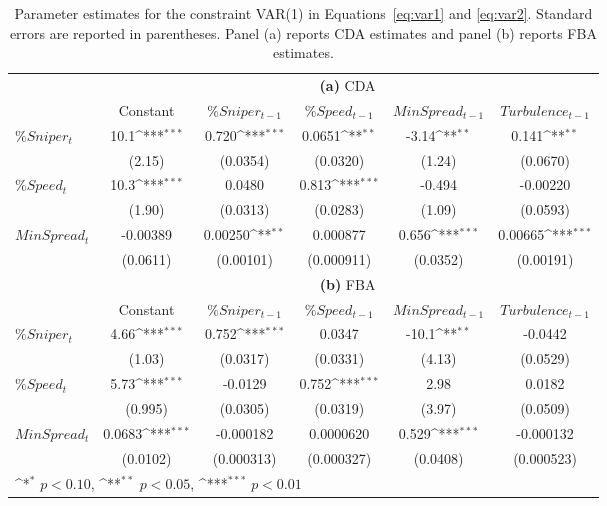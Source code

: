 \documentclass[12pt]{article}
\def\sym#1{\ifmmode^{#1}\else\(^{#1}\)\fi}
\begin{document}
\begin{table}[ht]
\vspace{.1in}
\begin{center}
\begin{tabular}{lccccc}
\hline %
& \multicolumn{5}{c}{{\bf (a)} CDA} \\
\cline{2-6} %
& Constant & $\%Sniper_{t-1}$ & $\%Speed_{t-1}$ & $MinSpread_{t-1}$ & $Turbulence_{t-1}$ \\
\hline %
$\%Sniper_t$ & 10.1\sym{***} & 0.720\sym{***} & 0.0651\sym{**} & -3.14\sym{**} & 0.141\sym{**} \\
& (2.15) & (0.0354) & (0.0320) & (1.24) & (0.0670) \\
$\%Speed_t$ & 10.3\sym{***} & 0.0480  & 0.813\sym{***} & -0.494 & -0.00220 \\
& (1.90) & (0.0313) & (0.0283) & (1.09) & (0.0593) \\
$MinSpread_t$ & -0.00389 & 0.00250\sym{**} & 0.000877 & 0.656\sym{***} & 0.00665\sym{***} \\
& (0.0611) & (0.00101) & (0.000911) & (0.0352) & (0.00191) \\
\hline %
& \multicolumn{5}{c}{{\bf (b)} FBA} \\
\cline{2-6} %
& Constant & $\%Sniper_{t-1}$ & $\%Speed_{t-1}$ & $MinSpread_{t-1}$ & $Turbulence_{t-1}$ \\
\hline %
$\%Sniper_t$ & 4.66\sym{***} & 0.752\sym{***} & 0.0347 & -10.1\sym{**} & -0.0442 \\
& (1.03) & (0.0317) & (0.0331) & (4.13) & (0.0529) \\
$\%Speed_t$ & 5.73\sym{***} & -0.0129 & 0.752\sym{***} & 2.98 & 0.0182 \\
&  (0.995) & (0.0305) & (0.0319) & (3.97) & (0.0509)\\
$MinSpread_t$ & 0.0683\sym{***} & -0.000182 & 0.0000620 & 0.529\sym{***} & -0.000132 \\
& (0.0102) & (0.000313) & (0.000327) & (0.0408) & (0.000523) \\
\hline %
\multicolumn{6}{l}{\footnotesize \sym{*} \(p<0.10\), \sym{**} \(p<0.05\), \sym{***} \(p<0.01\)}\\
\end{tabular}
\end{center}
\caption{Parameter estimates for the constraint VAR(1) in Equations~\eqref{eq:var1} and \eqref{eq:var2}. Standard errors are reported in parentheses. Panel (a) reports CDA estimates and panel (b) reports FBA estimates.}
\label{tab:varTable}
\end{table}
\end{document}
